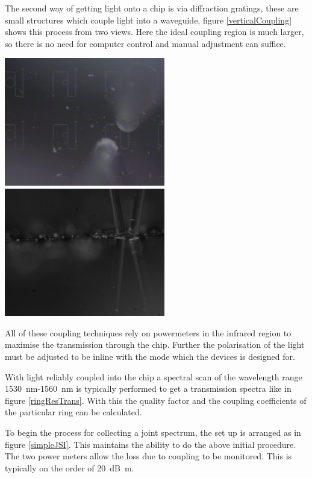 The second way of getting light onto a chip is via diffraction gratings, these are small structures which couple light into a waveguide, figure \ref{verticalCoupling} shows this process from two views. Here the ideal coupling region is much larger, so there is no need for computer control and manual adjustment can suffice.
\newline

\begingroup
    \centering  
    \includegraphics[width=7cm]{img/method/chipPictures/verticalCouplingTopView.png}
    \includegraphics[width=7cm]{img/method/chipPictures/verticalCouplingSideView.png}
     \vspace{3pt} \label{verticalCoupling}
\endgroup

All of these coupling techniques rely on powermeters in the infrared region to maximise the transmission through the chip. Further the polarisation of the light must be adjusted to be inline with the mode which the devices is designed for. 

With light reliably coupled into the chip a spectral scan of the wavelength range \SI{1530}{\nano\meter}-\SI{1560}{\nano\meter} is typically performed to get a transmission spectra like in figure \ref{ringResTrans}. With this the quality factor and the coupling coefficients of the particular ring can be calculated. 

To begin the process for collecting a joint spectrum, the set up is arranged as in figure \ref{simpleJSI}. This maintains the ability to do the above initial procedure. The two power meters allow the loss due to coupling to be monitored. This is typically on the order of \SI{20}{\deci\bel\m}.

